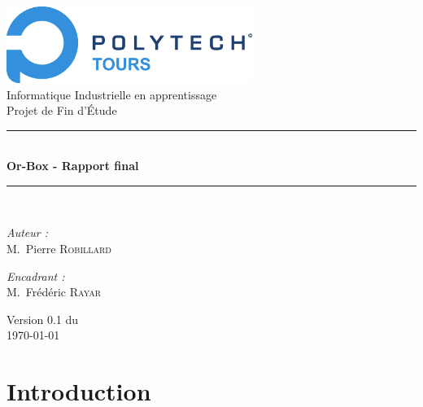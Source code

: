 \documentclass[a4paper]{report}
\begin{document}

\begin{titlepage}
\begin{center}

\includegraphics[width=0.6\textwidth]{img/logo_polytech.png}\\[1cm]

{\large Informatique Industrielle en apprentissage}\\[0.5cm]

{\large Projet de Fin d'Étude}\\[0.5cm]

\rule{\linewidth}{0.5mm} \\[0.4cm]
{ \huge \bfseries Or-Box - Rapport final\\[0.4cm] }
\rule{\linewidth}{0.5mm} \\[1.5cm]

\noindent
\begin{minipage}{0.4\textwidth}
  \begin{flushleft} \large
    \emph{Auteur :}\\
    M.~Pierre \textsc{Robillard}\\
  \end{flushleft}
\end{minipage}%
\begin{minipage}{0.4\textwidth}
  \begin{flushright} \large
    \emph{Encadrant :} \\
    M.~Frédéric \textsc{Rayar}\\
  \end{flushright}
\end{minipage}

\vfill

{\large Version 0.1 du\\ \today}

\end{center}
\end{titlepage}

\tableofcontents
\listoffigures

\chapter{Introduction}
\end{document}
